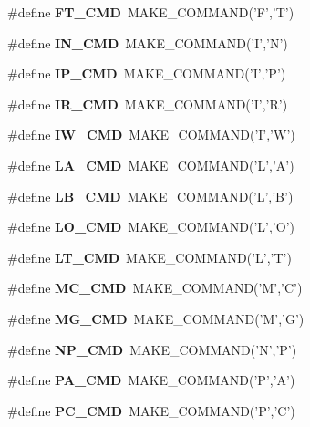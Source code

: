 \begin{CompactItemize}
\item 
\#define \textbf{FT\_\-CMD}~MAKE\_\-COMMAND('F','T')\label{hpgsreader_8h_88bf88ba2e8b7d6a7c508515864f4936}

\item 
\#define \textbf{IN\_\-CMD}~MAKE\_\-COMMAND('I','N')\label{hpgsreader_8h_e6d20bf287ebdfa2cf4264d10f4dad67}

\item 
\#define \textbf{IP\_\-CMD}~MAKE\_\-COMMAND('I','P')\label{hpgsreader_8h_f435fa20a5e0578e5de7200790b6cedb}

\item 
\#define \textbf{IR\_\-CMD}~MAKE\_\-COMMAND('I','R')\label{hpgsreader_8h_3442212d2aaf4032596e65577223e353}

\item 
\#define \textbf{IW\_\-CMD}~MAKE\_\-COMMAND('I','W')\label{hpgsreader_8h_32d9b8ad9f11e5cfd42847e9359a0822}

\item 
\#define \textbf{LA\_\-CMD}~MAKE\_\-COMMAND('L','A')\label{hpgsreader_8h_a204b94ee83fba02e985379006fd1802}

\item 
\#define \textbf{LB\_\-CMD}~MAKE\_\-COMMAND('L','B')\label{hpgsreader_8h_367a50a3eb7a106d80484edc7192864b}

\item 
\#define \textbf{LO\_\-CMD}~MAKE\_\-COMMAND('L','O')\label{hpgsreader_8h_3ebc1b1470bdb90231fb4f77637e3168}

\item 
\#define \textbf{LT\_\-CMD}~MAKE\_\-COMMAND('L','T')\label{hpgsreader_8h_c69ac0b854f70d6f69622ef667fe2e87}

\item 
\#define \textbf{MC\_\-CMD}~MAKE\_\-COMMAND('M','C')\label{hpgsreader_8h_6ed94d30762f635b033570a05bad8944}

\item 
\#define \textbf{MG\_\-CMD}~MAKE\_\-COMMAND('M','G')\label{hpgsreader_8h_9c923deff4222b75a6dd50d625022cc4}

\item 
\#define \textbf{NP\_\-CMD}~MAKE\_\-COMMAND('N','P')\label{hpgsreader_8h_ea5ed1063a8fce20aadfd44cb5f3dd1e}

\item 
\#define \textbf{PA\_\-CMD}~MAKE\_\-COMMAND('P','A')\label{hpgsreader_8h_fbc14c1b74f8161aca374090231277b0}

\item 
\#define \textbf{PC\_\-CMD}~MAKE\_\-COMMAND('P','C')\label{hpgsreader_8h_f51a57014af907d0618e6d44670632e5}


\end{CompactItemize}
